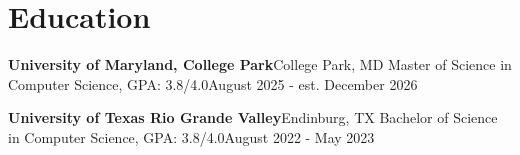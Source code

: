 \section{Education}
  \resumeSubHeadingListStart
    \resumeSubheading
      {\textbf{University of Maryland, College Park}}{College Park, MD}
      {Master of Science in Computer Science, GPA: 3.8/4.0}{August 2025 - est. December 2026}

    \resumeSubheading
      {\textbf{University of Texas Rio Grande Valley}}{Endinburg, TX}
      {Bachelor of Science in Computer Science, GPA: 3.8/4.0}{August 2022 - May 2023}
  \resumeSubHeadingListEnd
